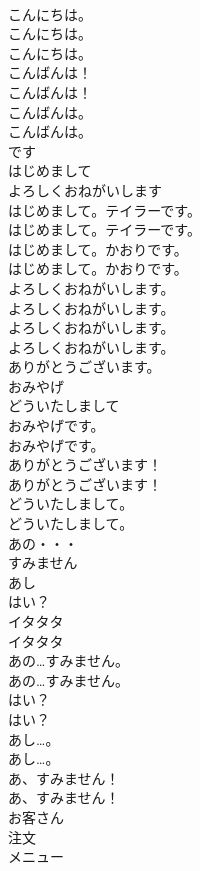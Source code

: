 \documentclass[8pt]{extreport}
\begin{document}
\begin{CJK}{UTF8}{min}
\\	こんにちは。 
\\	こんにちは。	
\\	こんにちは。 
\\	こんばんは！	
\\	こんばんは！ 
\\	こんばんは。	
\\	こんばんは。 
\\	です
\\	はじめまして
\\	よろしくおねがいします
\\	はじめまして。テイラーです。	
\\	はじめまして。テイラーです。 
\\	はじめまして。かおりです。	
\\	はじめまして。かおりです。 
\\	よろしくおねがいします。	
\\	よろしくおねがいします。 
\\	よろしくおねがいします。	
\\	よろしくおねがいします。 
\\	ありがとうございます。
\\	おみやげ
\\	どういたしまして
\\	おみやげです。	
\\	おみやげです。 
\\	ありがとうございます！	
\\	ありがとうございます！ 
\\	どういたしまして。	
\\	どういたしまして。 
\\	あの・・・
\\	すみません
\\	あし
\\	はい？
\\	イタタタ	
\\	イタタタ 
\\	あの…すみません。	
\\	あの…すみません。 
\\	はい？	
\\	はい？ 
\\	あし…。	
\\	あし…。 
\\	あ、すみません！	
\\	あ、すみません！ 
\\	お客さん
\\	注文
\\	メニュー

\end{CJK}
\end{document}

